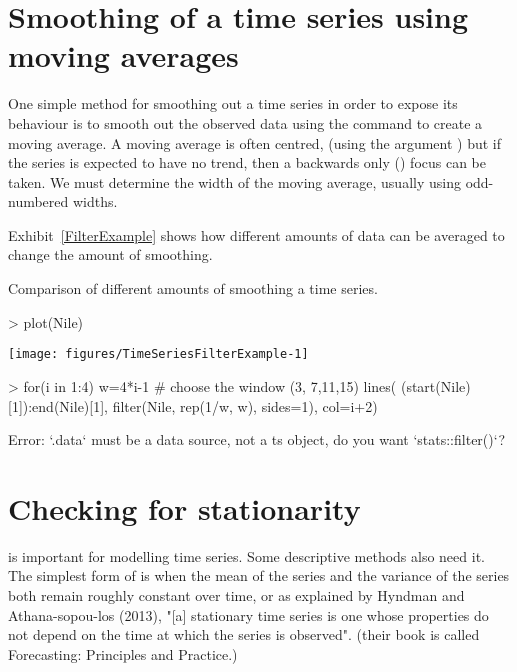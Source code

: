 \section{Smoothing of a time series using moving averages} 
 
One simple method for smoothing out a time series in order to expose its behaviour is to smooth out the observed data using  the  command to create a moving average. 
A moving average is often centred, (using the argument ) but if the series is expected to have no trend, then a backwards only ()  focus can be taken. We must determine the width of the moving average, usually using odd-numbered widths. 
 
Exhibit~\ref{FilterExample} shows how different amounts of data can be averaged to change the amount of smoothing. 
\begin{exhibit} 
\begin{center} 
\caption{Comparison of different amounts of smoothing a time series.} 
\label{FilterExample} 

\begin{Schunk}
\begin{Sinput}
> plot(Nile) 
\end{Sinput}

\texttt{[image: figures/TimeSeriesFilterExample-1]} \begin{Sinput}
> for(i in 1:4){ 
   w=4*i-1 # choose the window (3, 7,11,15) 
   lines( (start(Nile)[1]):end(Nile)[1], filter(Nile, rep(1/w, w), sides=1), col=i+2) 
   } 
\end{Sinput}
\begin{Soutput}
Error: `.data` must be a data source, not a ts object, do you want `stats::filter()`?
\end{Soutput}
\end{Schunk}

\end{center} 
\end{exhibit} 
 
\section{Checking for stationarity}\label{Stationarity}  
 
 is important for modelling time series. Some descriptive methods also need it. 
The simplest form of  is when the mean of the series and the variance of the series both remain roughly constant over time, or as explained by Hyndman and Athana-sopou-los (2013), "[a] stationary time series is one whose properties do not depend on the time at which the series is observed". (their book is called Forecasting: Principles and Practice.) 
  
